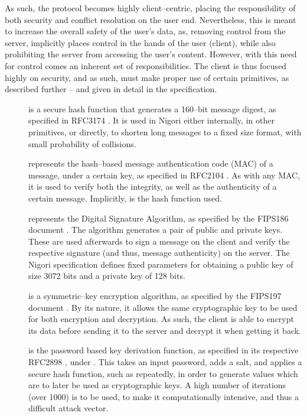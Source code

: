 
As such, the protocol becomes highly client--centric, placing the responsibility of both security and conflict resolution on the user end.
Nevertheless, this is meant to increase the overall safety of the user's data, as, removing control from the server, implicitly places control in the hands of the user (client), while also prohibiting the server from accessing the user's content.
However, with this need for control comes an inherent set of responsibilities.
The client is thus focused highly on security, and as such, must make proper use of certain primitives, as described further -- and given in detail in the specification.
\begin{description}
  \item[] is a secure hash function that generates a 160--bit message digest, as specified in RFC3174 \cite{RFC3174}.
  It is used in Nigori either internally, in other primitives, or directly, to shorten long messages to a fixed size format, with small probability of collisions.

  \item[] represents the hash--based message authentication code (MAC) of a message, under a certain key, as specified in RFC2104 \cite{RFC2104}.
  As with any MAC, it is used to verify both the integrity, as well as the authenticity of a certain message.
  Implicitly,  is the hash function used.

  \item[] represents the Digital Signature Algorithm, as specified by the FIPS186 document \cite{DSA}.
  The algorithm generates a pair of public and private keys.
  These are used afterwards to sign a message on the client and verify the respective signature (and thus, message authenticity) on the server.
  The Nigori specification defines fixed parameters for obtaining a public key of size 3072 bits and a private key of 128 bits.

  \item[] is a symmetric--key encryption algorithm, as specified by the FIPS197 document \cite{AES}.
  By its nature, it allows the same cryptographic key to be used for both encryption and decryption.
  As such, the client is able to encrypt its data before sending it to the server and decrypt it when getting it back.

  \item[] is the password based key derivation function, as specified in its respective RFC2898 \cite{RFC2898}, under .
  This takes an input password, adds a salt, and applies a secure hash function, such as  repeatedly, in order to generate values which are to later be used as cryptographic keys.
  A high number of iterations (over 1000) is to be used, to make it computationally intensive, and thus a difficult attack vector.
\end{description}

